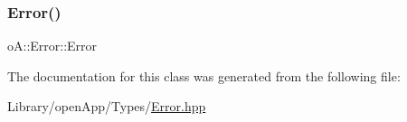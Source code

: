 \mbox{\label{classo_a_1_1_cast_error_adf66492ca8b03fa14d09e5bba7cdacbd}} 
\subsubsection{\texorpdfstring{Error()}{Error()}\hspace{0.1cm}{\footnotesize\ttfamily [2/2]}}
{\footnotesize\ttfamily o\+A\+::\+Error\+::\+Error\hspace{0.3cm}{\ttfamily [inline]}}



The documentation for this class was generated from the following file\+:\begin{DoxyCompactItemize}
\item 
Library/open\+App/\+Types/\mbox{\hyperlink{_error_8hpp}{Error.\+hpp}}\end{DoxyCompactItemize}
